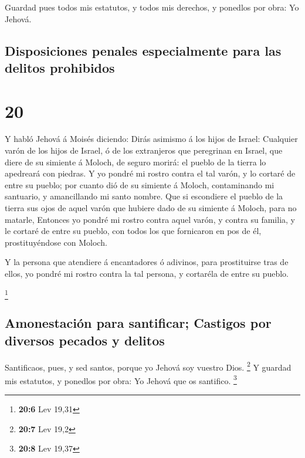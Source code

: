  Guardad pues todos mis estatutos, y todos mis derechos,
y ponedlos por obra: Yo Jehová.

\hypertarget{disposiciones-penales-especialmente-para-las-delitos-prohibidos}{%
\subsection{Disposiciones penales especialmente para las delitos
prohibidos}\label{disposiciones-penales-especialmente-para-las-delitos-prohibidos}}

\hypertarget{section-19}{%
\section{20}\label{section-19}}

 Y habló Jehová á Moisés diciendo:  Dirás
asimismo á los hijos de Israel: Cualquier varón de los hijos de Israel,
ó de los extranjeros que peregrinan en Israel, que diere de su simiente
á Moloch, de seguro morirá: el pueblo de la tierra lo apedreará con
piedras.  Y yo pondré mi rostro contra el tal varón, y lo
cortaré de entre su pueblo; por cuanto dió de su simiente á Moloch,
contaminando mi santuario, y amancillando mi santo nombre.
 Que si escondiere el pueblo de la tierra sus ojos de
aquel varón que hubiere dado de su simiente á Moloch, para no matarle,
 Entonces yo pondré mi rostro contra aquel varón, y contra
su familia, y le cortaré de entre su pueblo, con todos los que
fornicaron en pos de él, prostituyéndose con Moloch.

 Y la persona que atendiere á encantadores ó adivinos,
para prostituirse tras de ellos, yo pondré mi rostro contra la tal
persona, y cortaréla de entre su pueblo.

\footnote{\textbf{20:6} Lev 19,31}

\hypertarget{amonestaciuxf3n-para-santificar-castigos-por-diversos-pecados-y-delitos}{%
\subsection{Amonestación para santificar; Castigos por diversos pecados
y
delitos}\label{amonestaciuxf3n-para-santificar-castigos-por-diversos-pecados-y-delitos}}

 Santificaos, pues, y sed santos, porque yo Jehová soy
vuestro Dios. \footnote{\textbf{20:7} Lev 19,2}  Y guardad
mis estatutos, y ponedlos por obra: Yo Jehová que os santifico.
\footnote{\textbf{20:8} Lev 19,37}

